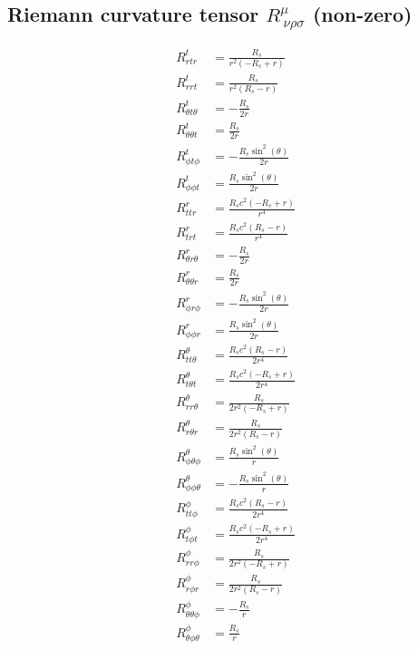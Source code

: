\documentclass{article}
\begin{document}
\subsection{Riemann curvature tensor $R^{\mu}_{\ \nu\rho\sigma}$ (non-zero)}
\begin{align}
R^{t}_{r t r} &= \frac{R_{s}}{r^{2} \left(- R_{s} + r\right)} \\
R^{t}_{r r t} &= \frac{R_{s}}{r^{2} \left(R_{s} - r\right)} \\
R^{t}_{\theta t \theta} &= - \frac{R_{s}}{2 r} \\
R^{t}_{\theta \theta t} &= \frac{R_{s}}{2 r} \\
R^{t}_{\phi t \phi} &= - \frac{R_{s} \sin^{2}{\left(\theta \right)}}{2 r} \\
R^{t}_{\phi \phi t} &= \frac{R_{s} \sin^{2}{\left(\theta \right)}}{2 r} \\
R^{r}_{t t r} &= \frac{R_{s} c^{2} \left(- R_{s} + r\right)}{r^{4}} \\
R^{r}_{t r t} &= \frac{R_{s} c^{2} \left(R_{s} - r\right)}{r^{4}} \\
R^{r}_{\theta r \theta} &= - \frac{R_{s}}{2 r} \\
R^{r}_{\theta \theta r} &= \frac{R_{s}}{2 r} \\
R^{r}_{\phi r \phi} &= - \frac{R_{s} \sin^{2}{\left(\theta \right)}}{2 r} \\
R^{r}_{\phi \phi r} &= \frac{R_{s} \sin^{2}{\left(\theta \right)}}{2 r} \\
R^{\theta}_{t t \theta} &= \frac{R_{s} c^{2} \left(R_{s} - r\right)}{2 r^{4}} \\
R^{\theta}_{t \theta t} &= \frac{R_{s} c^{2} \left(- R_{s} + r\right)}{2 r^{4}} \\
R^{\theta}_{r r \theta} &= \frac{R_{s}}{2 r^{2} \left(- R_{s} + r\right)} \\
R^{\theta}_{r \theta r} &= \frac{R_{s}}{2 r^{2} \left(R_{s} - r\right)} \\
R^{\theta}_{\phi \theta \phi} &= \frac{R_{s} \sin^{2}{\left(\theta \right)}}{r} \\
R^{\theta}_{\phi \phi \theta} &= - \frac{R_{s} \sin^{2}{\left(\theta \right)}}{r} \\
R^{\phi}_{t t \phi} &= \frac{R_{s} c^{2} \left(R_{s} - r\right)}{2 r^{4}} \\
R^{\phi}_{t \phi t} &= \frac{R_{s} c^{2} \left(- R_{s} + r\right)}{2 r^{4}} \\
R^{\phi}_{r r \phi} &= \frac{R_{s}}{2 r^{2} \left(- R_{s} + r\right)} \\
R^{\phi}_{r \phi r} &= \frac{R_{s}}{2 r^{2} \left(R_{s} - r\right)} \\
R^{\phi}_{\theta \theta \phi} &= - \frac{R_{s}}{r} \\
R^{\phi}_{\theta \phi \theta} &= \frac{R_{s}}{r} \\
\end{align}
\end{document}
